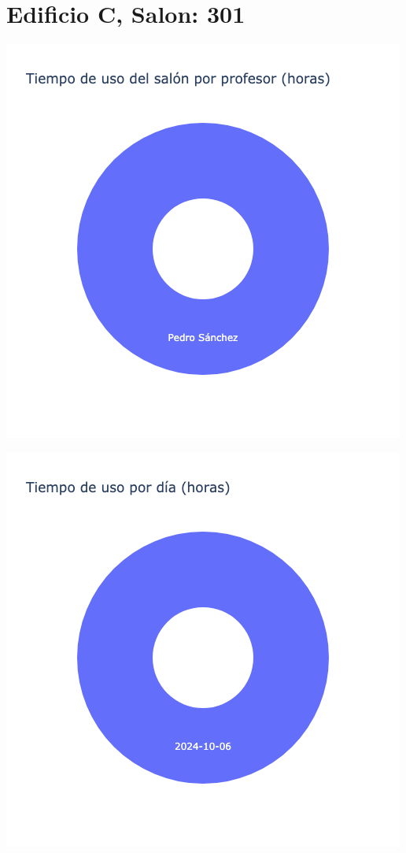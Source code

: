 \documentclass{article}
\begin{document}
    \section{Edificio C, Salon: 301}
    \noindent
    \begin{minipage}{0.48\textwidth}
        \centering
        \includegraphics[width=\textwidth]{../img/pie/UP301-90Dias-03-12-2024.png}
    \end{minipage}
    \hfill
    \begin{minipage}{0.48\textwidth}
        \centering
        \includegraphics[width=\textwidth]{../img/pie/UD301-90Dias-03-12-2024.png}
    \end{minipage}
    
\end{document}
